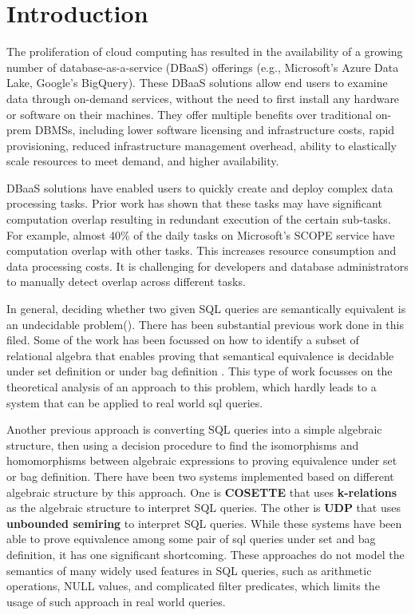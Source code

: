 \section{Introduction}\label{sec:introduction}

The proliferation of cloud computing has resulted in the availability of
a growing number of database-as-a-service (DBaaS) offerings (e.g., 
Microsoft's Azure Data Lake, Google's BigQuery). 
These DBaaS solutions allow end users to examine data through on-demand
services, without the need to first install any hardware or software on their
machines. They offer multiple benefits over traditional on-prem DBMSs,  
including lower software licensing and infrastructure costs, 
rapid provisioning, 
reduced infrastructure management overhead, 
ability to elastically scale resources to meet demand, and 
higher availability.

DBaaS solutions have enabled users to quickly create and deploy complex data
processing tasks. Prior work has shown that these tasks may have significant
computation overlap resulting in redundant execution of the certain sub-tasks.
For example, almost 40\% of the daily tasks on  Microsoft's SCOPE service 
have computation overlap with other tasks. 
This increases resource consumption and data processing costs.
It is challenging for developers and database administrators to manually  
detect overlap across different tasks.

In general, deciding whether two given SQL queries are semantically equivalent
is an undecidable problem().
There has been substantial previous work done in this filed.
Some of the work has been focussed on how to identify a subset of relational
algebra that enables proving that semantical equivalence is decidable under set
definition  or under bag definition .
This type of work focusses on the theoretical analysis of an approach to this
problem, which hardly leads to a system that can be applied to real world sql
queries.

Another previous approach is converting SQL queries into a simple algebraic
structure, then using a decision procedure to find the isomorphisms and
homomorphisms between algebraic expressions to proving equivalence under set or
bag definition.
There have been two systems implemented based on different algebraic structure
by this approach.
One is \textbf{COSETTE}  that uses \textbf{k-relations} as the
algebraic structure to interpret SQL queries.
The other is \textbf{UDP}  that uses \textbf{unbounded semiring} to
interpret SQL queries.
While these systems have been able to prove equivalence among some pair of sql
queries under set and bag definition, it has one significant shortcoming.
These approaches do not model the semantics of many widely used features in SQL
queries, such as arithmetic operations, NULL values, and complicated filter predicates,
which limits the usage of such approach in real world queries.

